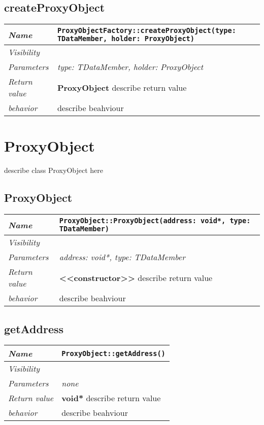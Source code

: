 \section{createProxyObject}
\begin{longtable}{p{3cm} @{\hskip 1cm} p{12cm}}
 \hline
\textit{Name} & \texttt{ProxyObjectFactory::createProxyObject(type: TDataMember, holder: ProxyObject)}\\
\hline
 \textit{Visibility} & \\
\hline
\textit{Parameters} & \textit{type: TDataMember, holder: ProxyObject}\\
\hline
\textit{Return value} & \textbf{ ProxyObject} describe return value\\
  \hline
 \textit{behavior} & describe beahviour \\
\hline
\end{longtable} \pagebreak
 \chapter{ProxyObject}
describe class ProxyObject here
\section{ProxyObject}
\begin{longtable}{p{3cm} @{\hskip 1cm} p{12cm}}
 \hline
\textit{Name} & \texttt{ProxyObject::ProxyObject(address: void*, type: TDataMember)}\\
\hline
 \textit{Visibility} & \\
\hline
\textit{Parameters} & \textit{address: void*, type: TDataMember}\\
\hline
\textit{Return value} & \textbf{ <<constructor>>} describe return value\\
  \hline
 \textit{behavior} & describe beahviour \\
\hline
\end{longtable} \pagebreak
 \section{getAddress}
\begin{longtable}{p{3cm} @{\hskip 1cm} p{12cm}}
 \hline
\textit{Name} & \texttt{ProxyObject::getAddress()}\\
\hline
 \textit{Visibility} & \\
\hline
\textit{Parameters} & \textit{none}\\
\hline
\textit{Return value} & \textbf{ void*} describe return value\\
  \hline
 \textit{behavior} & describe beahviour \\
\hline
\end{longtable} \pagebreak
